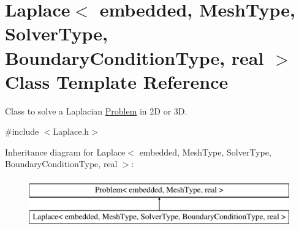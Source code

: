 \hypertarget{class_laplace}{\section{\-Laplace$<$ embedded, \-Mesh\-Type, \-Solver\-Type, \-Boundary\-Condition\-Type, real $>$ \-Class \-Template \-Reference}
\label{class_laplace}
}


\-Class to solve a \-Laplacian \hyperlink{class_problem}{\-Problem} in 2\-D or 3\-D.  




{\ttfamily \#include $<$\-Laplace.\-h$>$}

\-Inheritance diagram for \-Laplace$<$ embedded, \-Mesh\-Type, \-Solver\-Type, \-Boundary\-Condition\-Type, real $>$\-:\begin{figure}[H]
\begin{center}
\leavevmode
\includegraphics[height=2.000000cm]{class_laplace}
\end{center}
\end{figure}
